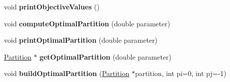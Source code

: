 \begin{DoxyCompactItemize}
\item 
\hypertarget{classNHONode_a615ee571b738b3fe0d60e0ed1acc7612}{void {\bfseries print\-Objective\-Values} ()}\label{classNHONode_a615ee571b738b3fe0d60e0ed1acc7612}

\item 
\hypertarget{classNHONode_a4cab45b2ba487bb6573fcd91d1495d05}{void {\bfseries compute\-Optimal\-Partition} (double parameter)}\label{classNHONode_a4cab45b2ba487bb6573fcd91d1495d05}

\item 
\hypertarget{classNHONode_a49eda2179eb77aa824e4a853a5576621}{void {\bfseries print\-Optimal\-Partition} (double parameter)}\label{classNHONode_a49eda2179eb77aa824e4a853a5576621}

\item 
\hypertarget{classNHONode_ab31e6785db37a35332bfc538b873bb44}{\hyperlink{classPartition}{Partition} $\ast$ {\bfseries get\-Optimal\-Partition} (double parameter)}\label{classNHONode_ab31e6785db37a35332bfc538b873bb44}

\item 
\hypertarget{classNHONode_a67d75346ed592f669f0029c2e1550371}{void {\bfseries build\-Optimal\-Partition} (\hyperlink{classPartition}{Partition} $\ast$partition, int pi=0, int pj=-\/1)}\label{classNHONode_a67d75346ed592f669f0029c2e1550371}

\end{DoxyCompactItemize}
